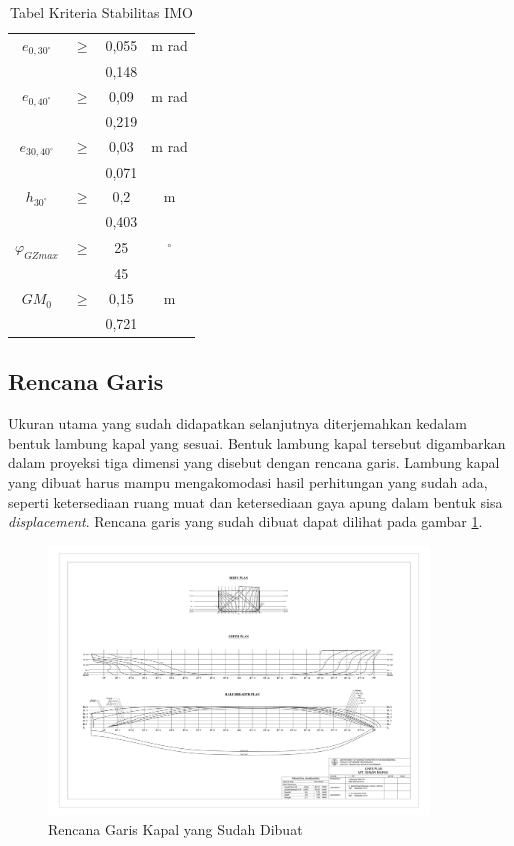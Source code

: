 \begin{table}[htbp]
\centering
\begin{tabular}{|c|c|c|c|}
\hline
$e_{0,30^\circ}$ & $\geq$ & 0,055 & m rad \\
 &  & 0,148 &  \\
\hline
$e_{0,40^\circ}$ & $\geq$ & 0,09 & m rad \\
 &  & 0,219 &  \\
\hline
$e_{30,40^\circ}$ & $\geq$ & 0,03 & m rad \\
 &  & 0,071 &  \\
\hline
$h_{30^\circ}$ & $\geq$ & 0,2 & m \\
 &  & 0,403 &  \\
\hline
$\varphi_{GZmax}$ & $\geq$ & 25 & $^\circ$ \\
 &  & 45 &  \\
\hline
$GM_0$ & $\geq$ & 0,15 & m \\
 &  & 0,721 &  \\
\hline
\end{tabular}
\caption{Tabel Kriteria Stabilitas IMO}
\label{tabel-stabilitas-IMO}
\end{table}


\subsection{Rencana Garis}
\label{subsec:rencana-garis-kapal}

Ukuran utama yang sudah didapatkan selanjutnya diterjemahkan kedalam bentuk lambung kapal yang sesuai. Bentuk lambung kapal tersebut digambarkan dalam proyeksi tiga dimensi yang disebut dengan rencana garis. Lambung kapal yang dibuat harus mampu mengakomodasi hasil perhitungan yang sudah ada, seperti ketersediaan ruang muat dan ketersediaan gaya apung dalam bentuk sisa \emph{displacement}. Rencana garis yang sudah dibuat dapat dilihat pada gambar \ref{fig:lines-plan}.

\begin{figure}[htbp!]
    \centering
    \includegraphics[width=0.9\textwidth]{gambar/Lines Plan 22 Ujil 03 48_page-0001(1).jpg}
    \caption{Rencana Garis Kapal yang Sudah Dibuat}
    \label{fig:lines-plan}
\end{figure}


